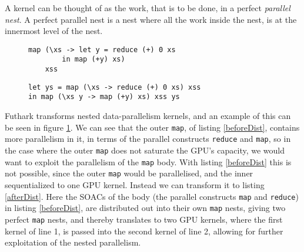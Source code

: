 A kernel can be thought of as the work, that is to be done, in a perfect \textit{parallel nest}. A perfect parallel nest is a nest where all the work inside the nest, is at the innermost level of the nest. 
\begin{figure}
\centering
	\begin{minipage}{0.45\textwidth}
	\centering
	\begin{lstlisting}
map (\xs -> let y = reduce (+) 0 xs 
		in map (+y) xs)
	xss
	\end{lstlisting}
	 \label{beforeDist}
	\end{minipage}\hspace*{\fill}
	\begin{minipage}{0.45\textwidth}
	\centering
	\begin{lstlisting}
let ys = map (\xs -> reduce (+) 0 xs) xss
in map (\xs y -> map (+y) xs) xss ys
	\end{lstlisting}
	 \label{afterDist}
	\end{minipage}
	\label{loopDist}
\end{figure}
\noindent Futhark transforms nested data-parallelism kernels, and an example of this can be seen in figure \ref{loopDist}. We can see that the outer \texttt{map}, of listing \ref{beforeDist}, contains more parallelism in it, in terms of the parallel constructs \texttt{reduce} and \texttt{map}, so in the case where the outer \texttt{map} does not saturate the GPU's capacity, we would want to exploit the parallelism of the \texttt{map} body. With listing \ref{beforeDist} this is not possible, since the outer \texttt{map} would be parallelised, and the inner sequentialized to one GPU kernel. Instead we can transform it to listing \ref{afterDist}. Here the SOACs of the body (the parallel constructs \texttt{map} and \texttt{reduce}) in listing \ref{beforeDist}, are distributed out into their own \texttt{map} nests, giving two perfect \texttt{map} nests, and thereby translates to two GPU kernels, where the first kernel of line 1, is passed into the second kernel of line 2, allowing for further exploitation of the nested parallelism.

